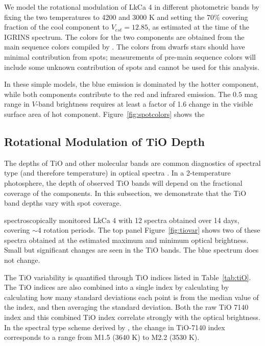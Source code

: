 \documentclass[twocolumn]{emulateapj}%
\begin{document}
We model the rotational modulation of LkCa 4 in different photometric bands by fixing the two temperatures to 4200 and 3000 K and setting the 70\% covering fraction of the cool component to $V_{est}=12.85$, as estimated at the time of the IGRINS spectrum.  The colors for the two components are obtained from the main sequence colors compiled by \citet{kenyon95}.  The colors from dwarfs stars should have minimal contribution from spots; measurements of pre-main sequence colors will include some unknown contribution of spots and cannot be used for this analysis.  

In these simple models, the blue emission is dominated by the hotter component, while both components contribute to the red and infrared emission.   
The $0.5$ mag range in $V$-band brightness requires at least a factor of 1.6 change in the visible surface area of hot component.  Figure~\ref{fig:spotcolors} shows the 



\subsection{Rotational Modulation of TiO Depth}

The depths of TiO and other molecular bands are common diagnostics of spectral type (and therefore temperature) in optical spectra \citep[e.g.][]{kirkpatrick91}.  In a 2-temperature photosphere, the depth of observed TiO bands will depend on the fractional coverage of the components.  In this subsection, we demonstrate that the TiO band depths vary with spot coverage.

\citet{donati14} spectroscopically monitored LkCa 4 with 12 spectra obtained over 14 days, covering $\sim 4$ rotation periods.  The top panel Figure~\ref{fig:tiovar} shows two of these spectra obtained at the estimated maximum and minimum optical brightness.  Small but significant changes are seen in the TiO bands.  The blue spectrum does not change.

The TiO variability is quantified through TiO indices listed in Table~\ref{tab:tiO}.  The TiO indices are also combined into a single index by calculating by 
calculating how many standard deviations each point is from the median value of the index, and then averaging the standard deviation.  Both the raw TiO 7140 index and this combined TiO index correlate strongly with the optical brightness.  In the spectral type scheme derived by \citet{herczeg14}, the change in TiO-7140 index corresponds to a range from M1.5 (3640 K) to M2.2 (3530 K).
\end{document}
